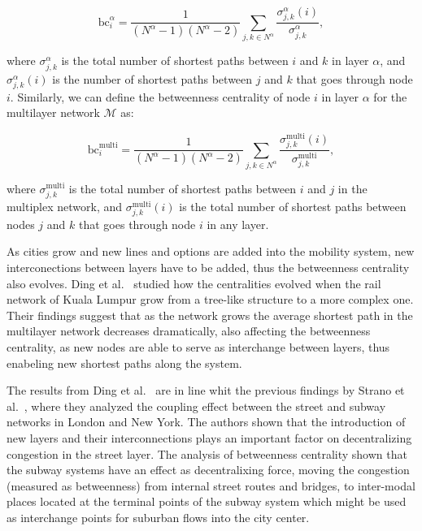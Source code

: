\begin{equation}
     \text{bc}_i^\alpha=\frac{1}{(N^\alpha-1)(N^\alpha-2)}\sum_{j,k\in N^\alpha}\frac{\sigma_{j,k}^\alpha(i)}{\sigma_{j,k}^\alpha}, 
 \end{equation}

where $\sigma_{j,k}^\alpha$ is the total number of shortest paths between $i$ and $k$ in layer $\alpha$, and $\sigma_{j,k}^\alpha(i)$ is the number of shortest paths between $j$ and $k$ that goes through node $i$. Similarly, we can define the betweenness centrality of node $i$ in layer $\alpha$ for the multilayer network $\mathcal{M}$ as:

\begin{equation}
     \text{bc}_i^\text{multi}=\frac{1}{(N^\alpha-1)(N^\alpha-2)}\sum_{j,k\in N^\alpha}\frac{\sigma_{j,k}^\text{multi}(i)}{\sigma_{j,k}^\text{multi}}, 
\end{equation}

where $\sigma_{j,k}^\text{multi}$ is the total number of shortest paths between $i$ and $j$ in the multiplex network, and $\sigma_{j,k}^\text{multi}(i)$ is the total number of shortest paths between nodes $j$ and $k$ that goes through node $i$ in any layer.

As cities grow and new lines and options are added into the mobility system, new interconections between layers have to be added, thus the betweenness centrality also evolves. Ding et al.~\cite{ding2018traffic} studied how the centralities evolved when the rail network of Kuala Lumpur grow from a tree-like structure to a more complex one. Their findings suggest that as the network grows the average shortest path in the multilayer network decreases dramatically, also affecting the betweenness centrality, as new nodes are able to serve as interchange between layers, thus enabeling new shortest paths along the system.

The results from Ding et al.~\cite{ding2018traffic} are in line whit the previous findings by Strano et al.~\cite{strano2015features}, where they analyzed the coupling effect between the street and subway networks in London and New York. The authors shown that the introduction of new layers and their interconnections plays an important factor on decentralizing congestion in the street layer. The analysis of betweenness centrality shown that the subway systems have an effect as decentralixing force, moving the congestion (measured as betweenness) from internal street routes and bridges, to inter-modal places located at the terminal points of the subway system which might be used as interchange points for suburban flows into the city center.


